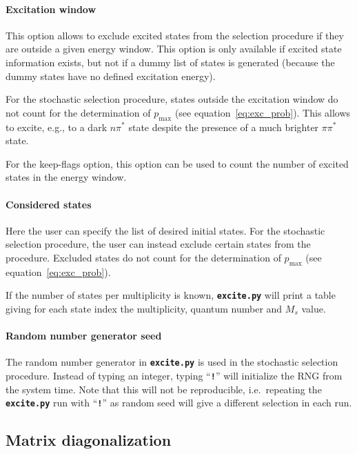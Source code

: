 \documentclass[a4paper,11pt,DIV=15,openany,twoside=false]{scrbook}
\newcommand{\ttt}[1]{\textbf{\texttt{#1}}}
\begin{document}
\paragraph{Excitation window}

This option allows to exclude excited states from the selection procedure if they are outside a given energy window. This option is only available if excited state information exists, but not if a dummy list of states is generated (because the dummy states have no defined excitation energy).

For the stochastic selection procedure, states outside the excitation window do not count for the determination of $p_\text{max}$ (see equation~\eqref{eq:exc_prob}). This allows to excite, e.g., to a dark $n\pi^*$ state despite the presence of a much brighter $\pi\pi^*$ state.

For the keep-flags option, this option can be used to count the number of excited states in the energy window.

\paragraph{Considered states}

Here the user can specify the list of desired initial states. 
For the stochastic selection procedure, the user can instead exclude certain states from the procedure. Excluded states do not count for the determination of $p_\text{max}$ (see equation~\eqref{eq:exc_prob}).

If the number of states per multiplicity is known, \ttt{excite.py} will print a table giving for each state index the multiplicity, quantum number and $M_s$ value.


\paragraph{Random number generator seed}

The random number generator in \ttt{excite.py} is used in the stochastic selection procedure. Instead of typing an integer, typing ``\ttt{!}'' will initialize the RNG from the system time. Note that this will not be reproducible, i.e.\ repeating the \ttt{excite.py} run with ``\ttt{!}'' as random seed will give a different selection in each run.



\subsection{Matrix diagonalization}
\end{document}
